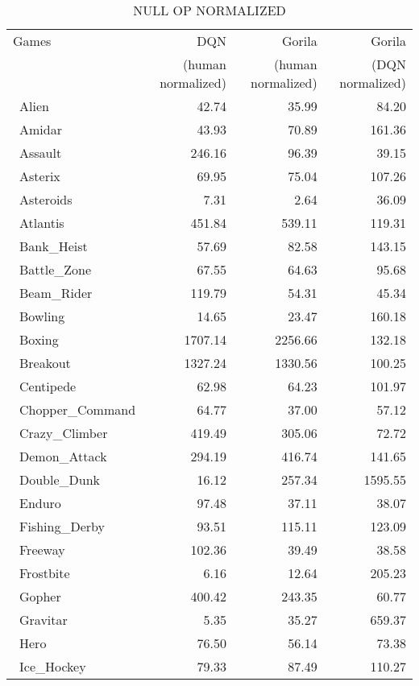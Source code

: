 \begin{table*}[h]
	\vskip 0.5in
	\caption {NULL OP NORMALIZED}
	\centering 
	\begin{tabular}{l|r|r|r}
		\hline \hline
		Games & DQN & Gorila & Gorila \\
		&  (human normalized) & (human normalized) & (DQN normalized) \\
		\hline\
		Alien & 42.74 & 35.99 & 84.20 \\
		\hline\
		Amidar & 43.93 & 70.89 & 161.36 \\
		\hline\
		Assault & 246.16 & 96.39 & 39.15 \\
		\hline\
		Asterix & 69.95 & 75.04 & 107.26 \\
		\hline\
		Asteroids & 7.31 & 2.64 & 36.09 \\
		\hline\
		Atlantis & 451.84 & 539.11 & 119.31 \\
		\hline\
		Bank\_Heist & 57.69 & 82.58 & 143.15 \\
		\hline\
		Battle\_Zone & 67.55 & 64.63 & 95.68 \\
		\hline\
		Beam\_Rider & 119.79 & 54.31 & 45.34 \\
		\hline\
		Bowling & 14.65 & 23.47 & 160.18 \\
		\hline\
		Boxing & 1707.14 & 2256.66 & 132.18 \\
		\hline\
		Breakout & 1327.24 & 1330.56 & 100.25 \\
		\hline\
		Centipede & 62.98 & 64.23 & 101.97 \\
		\hline\
		Chopper\_Command & 64.77 & 37.00 & 57.12 \\
		\hline\
		Crazy\_Climber & 419.49 & 305.06 & 72.72 \\
		\hline\
		Demon\_Attack & 294.19 & 416.74 & 141.65 \\
		\hline\
		Double\_Dunk & 16.12 & 257.34 & 1595.55 \\
		\hline\
		Enduro & 97.48 & 37.11 & 38.07 \\
		\hline\
		Fishing\_Derby & 93.51 & 115.11 & 123.09 \\
		\hline\
		Freeway & 102.36 & 39.49 & 38.58 \\
		\hline\
		Frostbite & 6.16 & 12.64 & 205.23 \\
		\hline\
		Gopher & 400.42 & 243.35 & 60.77 \\
		\hline\
		Gravitar & 5.35 & 35.27 & 659.37 \\
		\hline\
		Hero & 76.50 & 56.14 & 73.38 \\
		\hline\
		Ice\_Hockey & 79.33 & 87.49 & 110.27 \\

\end{tabular}
\end{table*}
